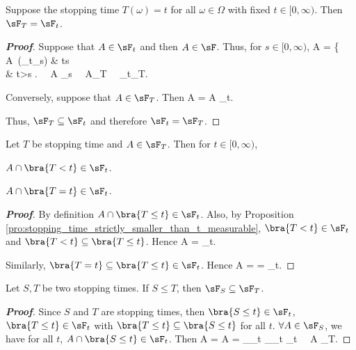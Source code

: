 \begin{proposition}
Suppose the stopping time $T(\omega)=t$ for all $\omega \in \Omega$ with fixed $t\in [0,\infty)$. Then $\sF_T = \sF_t$. 
\end{proposition}

\begin{proof}[\bf Proof]
Suppose that $A\in \sF_t$ and then $A\in \sF$. Thus, for $s\in [0,\infty)$, 
\be
A\cap {} = \left\{
A\ (\in \sF_t\subseteq \sF_s) \quad\quad & t\leq s \\
\emptyset & t>s 
\ea\right. \ \ra\ A\cap {} \in \sF_s \ \ra\ A\in \sF_T \ \ra\ \sF_t\subseteq \sF_T.
\ee

Conversely, suppose that $A\in \sF_T$. Then
\be
A = A \cap {} \in \sF_t.
\ee

Thus, $\sF_T\subseteq \sF_t$ and therefore $\sF_t= \sF_T$.
\end{proof}


\begin{proposition}
Let $T$ be stopping time and $A\in \sF_T$. Then for $t\in [0,\infty)$,
\ben
\item [(i)] $A\cap \bra{T<t} \in \sF_t$.
\item [(ii)] $A\cap \bra{T=t}\in \sF_t$.
\een
\end{proposition}

\begin{proof}[\bf Proof]
\ben
\item [(i)] By definition $A\cap \bra{T\leq t} \in \sF_t$. Also, by Proposition \ref{pro:stopping_time_strictly_smaller_than_t_measurable}, $\bra{T<t}\in \sF_t$ and $\bra{T<t}\subseteq \bra{T\leq t}$. Hence
\be
A\cap {} = \cap {} \in \sF_t.
\ee

\item [(ii)] Similarly, $\bra{T=t} \subseteq \bra{T\leq t} \in \sF_t$. Hence
\be
A\cap {} =  \cap {} =  \cap {} \in \sF_t. 
\ee
\een
\end{proof}

\begin{proposition}
Let $S,T$ be two stopping times. If $S\leq T$, then $\sF_S \subseteq \sF_T$.
\end{proposition}

\begin{proof}[\bf Proof]
Since $S$ and $T$ are stopping times, then $\bra{S \leq t}\in \sF_t$, $\bra{T \leq t}\in \sF_t$ with $\bra{T\leq t} \subseteq \bra{S\leq t}$ for all $t$. $\forall A \in \sF_S$, we have for all $t$, $A \cap \bra{S \leq t} \in \sF_t$. Then
\be
A \cap {} = A \cap {} = _{\in \sF_t} \cap {}_{\in \sF_t} \in \sF_t \ \ra \ A \in \sF_T.
\ee
\end{proof}



